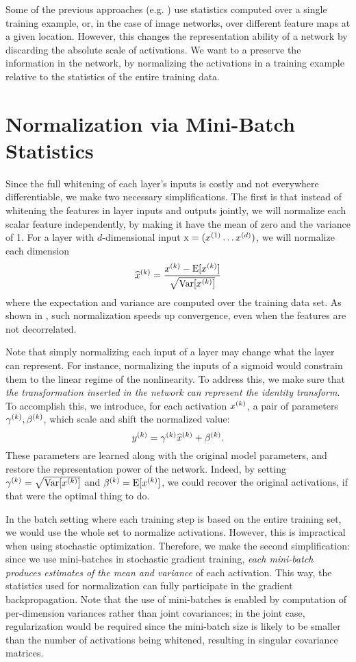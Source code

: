 \documentclass[twocolumn]{article}
\begin{document}
Some of the previous approaches
(e.g. \cite{lyu-simoncelli}) use statistics computed over a single
training example, or, in the case of image networks, over different
feature maps at a given location. However, this changes the
representation ability of a network by discarding the absolute scale
of activations. We want to a preserve the information in the network,
by normalizing the activations in a training example relative to the
statistics of the entire training data.

\section{Normalization via Mini-Batch Statistics}


Since the full whitening of each layer's inputs is costly and not
everywhere differentiable, we make two necessary simplifications. The first
 is that instead of whitening the features in layer
inputs and outputs jointly, we will normalize each scalar feature
independently, by making it have the mean of zero and the variance of
1. For a layer with $d$-dimensional input $\mathrm{x} = (x^{(1)}\ldots x^{(d)})$, we
will normalize each dimension 
$$\widehat{x}^{(k)} = \frac{x^{(k)}-\text{E}[x^{(k)}]}{
  \sqrt{\text{Var}[x^{(k)}]}}$$
where the expectation and variance are
computed over the training data set. As shown in
\cite{lecun-backprop}, such normalization speeds up convergence,
even when the  features are not decorrelated.


Note that simply normalizing each input of a layer may change what the
layer can represent. For instance, normalizing the inputs of a
sigmoid would constrain them to the linear
regime of the nonlinearity. To address this, we make sure that {\em the transformation inserted in
  the network can represent the identity transform}.  To
accomplish this, we introduce, for each activation $x^{(k)}$, a pair of
parameters $\gamma^{(k)}, \beta^{(k)}$, which scale and shift the
normalized value: $$y^{(k)} = \gamma^{(k)}\widehat{x}^{(k)} +
\beta^{(k)}.$$ These parameters are learned along with the original model
parameters, and restore the representation power of the
network. Indeed, by setting $\gamma^{(k)} = \sqrt{\text{Var}[x^{(k)}]}$ and
$\beta^{(k)} = \text{E}[x^{(k)}]$, we could recover the original activations, if that were the optimal thing to do.

In the batch setting where each training step is based on the entire training
set, we would use the whole set to normalize activations. However, this is
impractical when using stochastic optimization. Therefore, we make the second
simplification: since we use mini-batches in stochastic gradient training, {\em
  each mini-batch produces estimates of the mean and variance} of each
activation. This way, the statistics used for normalization can fully
participate in the gradient backpropagation.
Note that the use of mini-batches is enabled by computation of
per-dimension variances rather than joint covariances; in the joint case,
regularization would be required since the mini-batch size is likely to be
smaller than the number of activations being whitened, resulting in singular
covariance matrices.
\end{document}
